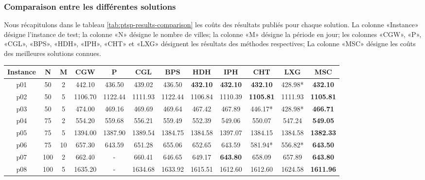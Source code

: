 \medskip

\subsubsection{Comparaison entre les différentes solutions}
\label{sec:ptps-comparison}
Nous récapitulons dans le tableau \ref{tab:ptsp-results-comparison} les coûts des résultats publiés pour chaque solution. La colonne «Instance» désigne l'instance de test; la colonne «N» désigne le nombre de villes; la colonne «M» désigne la période en jour; les colonnes «CGW», «P», «CGL», «BPS», «HDH», «IPH», «CHT» et «LXG» désignent les résultats des méthodes respectives; La colonne «MSC» désigne les coûts des meilleures solutions connues.


\begin{table}[h!]
    \centering
    \small\addtolength{\tabcolsep}{-5pt}
    \begin{tabular}{|c|c|c|c|c|c|c|c|c|c|c|c|}
    \hline
    Instance & N      & M     & CGW     & P       & CGL     & BPS     & HDH     & IPH     & CHT     & LXG     & MSC      \\\hline
    p01      & 50  & 2  & 442.10  & 436.50  & 439.02  & 436.50  & \textbf{432.10}  & \textbf{432.10}  & \textbf{432.10}  & 428.98*  & \textbf{432.10}   \\\hline
    p02      & 50  & 5  & 1106.70 & 1122.44 & 1111.93 & 1122.44 & 1106.84 & 1110.39 & \textbf{1105.81} & 1111.93 & \textbf{1105.81}  \\\hline
    p03      & 50  & 5  & 474.00  & 469.16  & 469.69  & 469.64  & 467.42  & 467.89  & 446.17*  & 428.98*  & \textbf{466.71}   \\\hline
    p04      & 75  & 2  & 554.20  & 559.68  & 556.21  & 559.49  & 552.39  & 549.06  & 550.07  & 547.24  & \textbf{549.05}   \\\hline
    p05      & 75  & 5  & 1394.00 & 1387.90 & 1389.54 & 1384.75 & 1384.58 & 1397.07 & 1384.15 & 1384.58 & \textbf{1382.33}  \\\hline
    p06      & 75  & 10 & 657.30  & 643.59  & 651.28  & 655.06  & 652.65  & 643.59  & 581.94*  & 556.82*  & \textbf{643.50}   \\\hline
    p07      & 100 & 2  & 662.40  &    -     & 660.41  & 646.65  & 649.17  & \textbf{643.80}  & 658.09  & 657.89  & \textbf{643.80}   \\\hline
    p08      & 100 & 5 & 1635.20 &     -    & 1634.68 & 1633.92 & 1615.51 & 1612.60 & 1612.60 & 1624.58 & \textbf{1611.96}  \\\hline

\end{tabular}
\end{table}
